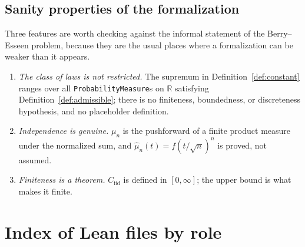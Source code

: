 \documentclass[10pt,a4paper]{article}
\theoremstyle{plain}
\theoremstyle{definition}
\newcommand{\R}{\mathbb{R}}
\newcommand{\Cii}{C_{\mathrm{iid}}}
\newcommand{\lean}[1]{\texttt{#1}}
\begin{document}
\subsection{Sanity properties of the formalization}

Three features are worth checking against the informal statement of the
Berry--Esseen problem, because they are the usual places where a formalization
can be weaker than it appears.
\begin{enumerate}[leftmargin=2.2em]
\item \emph{The class of laws is not restricted.} The supremum in
  Definition~\ref{def:constant} ranges over all \lean{ProbabilityMeasure}s on
  $\R$ satisfying Definition~\ref{def:admissible}; there is no finiteness,
  boundedness, or discreteness hypothesis, and no placeholder definition.
\item \emph{Independence is genuine.} $\mu_n$ is the pushforward of a finite
  product measure under the normalized sum, and
  $\hat\mu_n(t)=f(t/\sqrt n)^n$ is proved, not assumed.
\item \emph{Finiteness is a theorem.} $\Cii$ is defined in $[0,\infty]$; the
  upper bound is what makes it finite.
\end{enumerate}

\appendix
\section{Index of Lean files by role}
\end{document}

